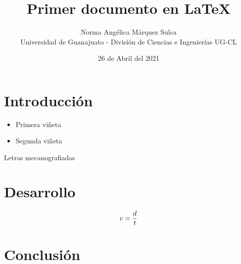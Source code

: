 \documentclass[12pt]{article}
\begin{document}
\title{Primer documento en LaTeX\vspace{1em}}

\author{\normalsize Norma Angélica Márquez Sulca\\ \normalsize Universidad de Guanajuato - División de Ciencias e Ingenierías UG-CL\vspace{1em}} 

\date{\normalsize 26 de Abril del 2021}
\maketitle{}


\section{Introducción} 
        \begin{itemize}
        \item Primera viñeta 
        \end{itemize}
        \begin{itemize}
        \item Segunda viñeta 
        \end{itemize}
    \begin{center}
    \ttfamily Letras mecanografiadas  \vspace{2em}       
    \end{center}

    


\section{Desarrollo}
        \begin{equation} 
        v=\frac{d}{t} \vspace{2em}
        \end{equation}

\section{Conclusión}
\end{document}
